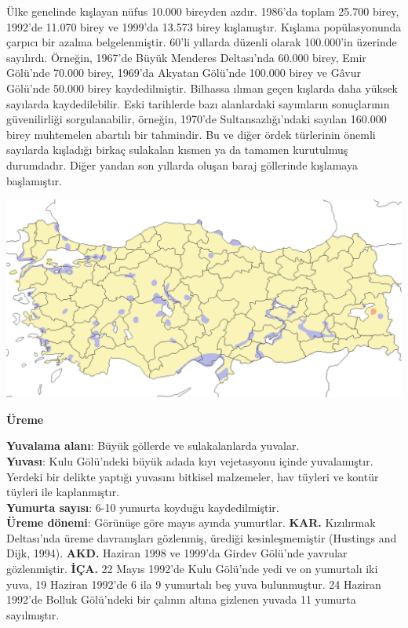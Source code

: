 \documentclass[
  a4paper,
  DIV=11,
  numbers=noendperiod]{scrartcl}
\begin{document}
Ülke genelinde kışlayan nüfus 10.000 bireyden azdır. 1986'da toplam
25.700 birey, 1992'de 11.070 birey ve 1999'da 13.573 birey kışlamıştır.
Kışlama popülasyonunda çarpıcı bir azalma belgelenmiştir. 60'li yıllarda
düzenli olarak 100.000'in üzerinde sayılırdı. Örneğin, 1967'de Büyük
Menderes Deltası'nda 60.000 birey, Emir Gölü'nde 70.000 birey, 1969'da
Akyatan Gölü'nde 100.000 birey ve Gâvur Gölü'nde 50.000 birey
kaydedilmiştir. Bilhassa ılıman geçen kışlarda daha yüksek sayılarda
kaydedilebilir. Eski tarihlerde bazı alanlardaki sayımların sonuçlarının
güvenilirliği sorgulanabilir, örneğin, 1970'de Sultansazlığı'ndaki
sayılan 160.000 birey muhtemelen abartılı bir tahmindir. Bu ve diğer
ördek türlerinin önemli sayılarda kışladığı birkaç sulakalan kısmen ya
da tamamen kurutulmuş durumdadır. Diğer yandan son yıllarda oluşan baraj
göllerinde kışlamaya başlamıştır.

\includegraphics{images/harita_Anas acuta.png}

\textbf{Üreme}

\textbf{Yuvalama alanı}: Büyük göllerde ve sulakalanlarda yuvalar.\\
\textbf{Yuvası}: Kulu Gölü'ndeki büyük adada kıyı vejetasyonu içinde
yuvalamıştır. Yerdeki bir delikte yaptığı yuvasını bitkisel malzemeler,
hav tüyleri ve kontür tüyleri ile kaplanmıştır.\\
\textbf{Yumurta sayısı}: 6-10 yumurta koyduğu kaydedilmiştir.\\
\textbf{Üreme dönemi}: Görünüşe göre mayıs ayında yumurtlar.
\textbf{KAR.} Kızılırmak Deltası'nda üreme davranışları gözlenmiş,
ürediği kesinleşmemiştir (Hustings and Dijk, 1994). \textbf{AKD.}
Haziran 1998 ve 1999'da Girdev Gölü'nde yavrular gözlenmiştir.
\textbf{İÇA.} 22 Mayıs 1992'de Kulu Gölü'nde yedi ve on yumurtalı iki
yuva, 19 Haziran 1992'de 6 ila 9 yumurtalı beş yuva bulunmuştur. 24
Haziran 1992'de Bolluk Gölü'ndeki bir çalının altına gizlenen yuvada 11
yumurta sayılmıştır.
\end{document}
